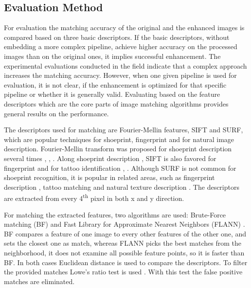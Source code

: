 \documentclass[draft,final]{vutinfth} %
\begin{document}
\subsection{Evaluation Method}
\par
For evaluation the matching accuracy of the original and the enhanced images is compared based on three basic descriptors.
If the basic descriptors, without embedding  a more complex pipeline, achieve higher accuracy on the processed  images than on the original ones, it implies successful enhancement. 
The experimental evaluations conducted in the field indicate \cite{rida2019forensic} that a complex approach increases the matching accuracy.
However, when one given pipeline is used for evaluation, it is not clear, if the enhancement is optimized for that specific pipeline or whether it is generally valid.
Evaluating based on the feature descriptors which are the core parts of image matching algorithms provides general results on the performance.
\par
The descriptors used for matching are Fourier-Mellin features, SIFT and SURF, which are popular techniques for shoeprint, fingerprint and for natural image description.
Fourier-Mellin transform was proposed for shoeprint description several times \cite{gueham2008automatic}, \cite{richetelli2017classification}, \cite{wu2019crime}.
Along shoeprint description \cite{nibouche2009rotation}, \cite{richetelli2017classification} SIFT is also favored for fingerprint \cite{zhou2011adaptive} and for tattoo identification \cite{yi2015impact}, \cite{han2013tattoo}.
Although SURF is not common for shoeprint recognition, it is popular in related areas, such as fingerprint description \cite{jahan2017robust}, tattoo matching \cite{yi2015impact} and natural texture description \cite{prabhakar2012lbp}.
The descriptors are extracted from every 4\textsuperscript{th} pixel in both x and y direction.
\par
For matching the extracted features, two algorithms are used: Brute-Force matching (BF) \cite{schaeffer1993re} and Fast Library for Approximate Nearest Neighbors (FLANN) \cite{muja2009fast}.
BF compares a feature of one image to every other features of the other one, and sets the closest one as match, whereas FLANN picks the best matches from the neighborhood, it does not examine all possible feature points, so it is faster than BF.
In both cases Euclidean distance is used to compare the descriptors.
To filter the provided matches Lowe's ratio test is used \cite{lowe2004distinctive}.
With this test the false positive matches are eliminated.
\end{document}
